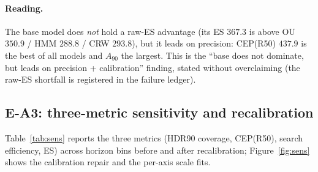 \documentclass[11pt]{article}
\begin{document}
\begin{table}[htbp]
\centering
\caption{External benchmark: point metrics. Base (I-1 SDE) leads on CEP(R50)
and $A_{90}$ but does \emph{not} dominate raw energy score (Kalman-CV/HMM/CRW
have lower ES).}
\label{tab:bench}
\small

\end{table}

\begin{table}[htbp]
\centering
\caption{External benchmark: paired $\Delta$ES verdicts (block bootstrap, 95\%
CI). Positive $\Delta$ES = base is worse; ``redundant'' means the baseline does
not significantly beat the base; ``loss'' means the base significantly wins.}
\label{tab:benchverdict}
\small

\end{table}

\paragraph{Reading.} The base model does \emph{not} hold a raw-ES advantage
(its ES $367.3$ is above OU $350.9$ / HMM $288.8$ / CRW $293.8$), but it leads
on precision: CEP(R50) $437.9$ is the best of all models and $A_{90}$ the
largest. This is the ``base does not dominate, but leads on precision +
calibration'' finding, stated without overclaiming (the raw-ES shortfall is
registered in the failure ledger).

\subsection{E-A3: three-metric sensitivity and recalibration}
\label{sec:exp-a3}
Table~\ref{tab:sens} reports the three metrics (HDR90 coverage, CEP(R50),
search efficiency, ES) across horizon bins before and after recalibration;
Figure~\ref{fig:sens} shows the calibration repair and the per-axis scale fits.

\begin{table}[htbp]
\centering
\caption{Three-metric sensitivity by horizon bin, before $\to$ after
recalibration. $\ge$1h $n{=}242$, 1--3h $n{=}228$, $\ge$3h $n{=}14$. The
recalibration repairs 1--3h HDR90 to $\approx0.90$; $\ge$3h global scale
under-repairs (0.643/0.786).}
\label{tab:sens}
\small

\end{table}

\begin{table}[htbp]
\centering
\caption{Horizon accounting: real evaluation segments and validation mode.}
\label{tab:data-hor}
\small

\end{table}
\end{document}
